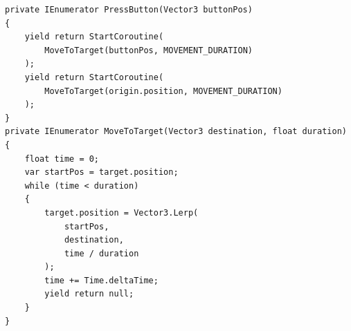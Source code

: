 \begin{lstlisting}[basicstyle=\linespread{0.9}\footnotesize\ttfamily, numbers=none,frame=single,
caption={The coroutine \textit{PressButton} executes two \textit{MoveToTarget}
coroutines, moving the end effector's target to the specified button, and then
back to the origin position. \textit{IKPressButton.cs}},captionpos=t,
label=second_coroutine, language={[Sharp]c}, float=tp]
private IEnumerator PressButton(Vector3 buttonPos)
{
    yield return StartCoroutine(
        MoveToTarget(buttonPos, MOVEMENT_DURATION)
    );
    yield return StartCoroutine(
        MoveToTarget(origin.position, MOVEMENT_DURATION)
    );
}
private IEnumerator MoveToTarget(Vector3 destination, float duration)
{
    float time = 0;
    var startPos = target.position;
    while (time < duration)
    {
        target.position = Vector3.Lerp(
            startPos,
            destination,
            time / duration
        );
        time += Time.deltaTime;
        yield return null;
    }
}
\end{lstlisting}


